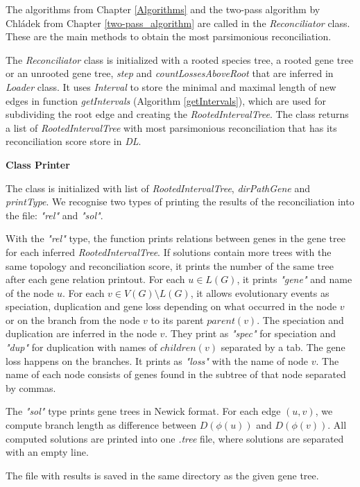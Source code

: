 The algorithms from Chapter \ref{Algorithms} and the two-pass algorithm by Chládek from Chapter \ref{two-pass_algorithm} are called in the \emph{Reconciliator} class. These are the main methods to obtain the most parsimonious reconciliation.

The \emph{Reconciliator} class is initialized with a rooted species tree, a rooted gene tree or an unrooted gene tree, \emph{step} and \emph{countLossesAboveRoot} that are inferred in \emph{Loader} class. It uses \emph{Interval} to store the minimal and maximal length of new edges in function \emph{getIntervals} (Algorithm \ref{getIntervals}), which are used for subdividing the root edge and creating the \emph{RootedIntervalTree}. The class returns a list of \emph{RootedIntervalTree} with most parsimonious reconciliation that has its reconciliation score store in \emph{DL}.

\noindent \textbf{Class Printer}

The class is initialized with list of \emph{RootedIntervalTree}, \emph{dirPathGene} and \emph{printType}. We recognise two types of printing the results of the reconciliation into the file: \emph{"rel"} and \emph{"sol"}.

With the \emph{"rel"} type, the function prints relations between genes in the gene tree for each inferred \emph{RootedIntervalTree}. If solutions contain more trees with the same topology and reconciliation score, it prints the number of the same tree after each gene relation printout. For each $u \in L(G)$, it prints \emph{"gene"} and name of the node $u$. For each $v \in V(G)\setminus L(G)$, it allows evolutionary events as speciation, duplication and gene loss depending on what occurred in the node $v$ or on the branch from the node $v$ to its parent $parent(v)$. The speciation and duplication are inferred in the node $v$. They print as \emph{"spec"} for speciation and \emph{"dup"} for duplication with names of $children(v)$ separated by a tab. The gene loss happens on the branches. It prints as \emph{"loss"} with the name of node $v$. The name of each node consists of genes found in the subtree of that node separated by commas. 

The \emph{"sol"} type prints gene trees in Newick format. For each edge $(u, v)$, we compute branch length as difference between $D(\phi(u))$ and $D(\phi(v))$. All computed solutions are printed into one \emph{.tree} file, where solutions are separated with an empty line.

The file with results is saved in the same directory as the given gene tree.

